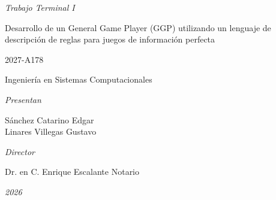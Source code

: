 \begin{titlepage}
\begin{minipage}[c][0.81\textheight][t]{0.75\textwidth}
    \centering

    \vspace{1cm}

    {\large\itshape\color{gray} Trabajo Terminal I\par}

    \vspace{0.5cm}

    {\LARGE
      Desarrollo de un General Game Player (GGP) utilizando un lenguaje
      de descripción de reglas para juegos de información perfecta
      \par}

    \vspace{0.5cm}

    {\large 2027-A178\par}

    \vspace{0.5cm}

    {\large Ingeniería en Sistemas Computacionales\par}

    \vspace{0.5cm}

    {\large\itshape\color{gray} Presentan\par}

    \vspace{0.2cm}

    {\large
      Sánchez Catarino Edgar\\
      Linares Villegas Gustavo
      \par}

    \vspace{1cm}

    {\large\itshape\color{gray} Director\par}

    \vspace{0.2cm}

    {\large
      Dr. en C. Enrique Escalante Notario
      \par}

    \vfill

    \begin{flushright}
      {\large\itshape 2026}
    \end{flushright}

  \end{minipage}

\end{titlepage}
